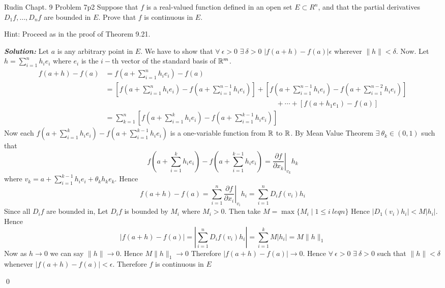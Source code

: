 \documentclass[a4paper, 11pt]{article}
\newcommand{\Qed}{\begin{flushright}\qed\end{flushright}}
\newcommand{\sol}[1]{\begin{solution}#1\end{solution}\Qed}
\newcommand{\parinn}{\setlength{\parindent}{1cm}}
\newenvironment{solution}
{\textbf{\textit{Solution: }}\setlength{\parindent}{1cm}}
{}
\begin{document}
	
	
	\begin{problem}{Rudin Chapt. 9 Problem 7}{p2%
		}
		Suppose that $f$ is a real-valued function defined in an open set $E \subset R^{n}$, and that the partial derivatives $D_{1} f, \ldots, D_{n} f$ are bounded in $E$. Prove that $f$ is continuous in $E$.\parinn
		
		Hint: Proceed as in the proof of Theorem 9.21.
	\end{problem}
	
	\sol{Let $a$ is any arbitrary point in $E$. We have to show that $\forall\ \epsilon>0$ $\exists \ \delta>0$ $|f(a+h)-f(a)|\epsilon$ wherever $\|h\|<\delta$. Now. Let $h=\sum\limits_{i=1}^n h_ie_i$ where $e_i$ is the $i-$th vector of the standard basis of $\mathbb{R}^m$. \begin{align*}
		f(a+h)-f(a) & =f\left(a+\sum_{i=1}^nh_ie_i\right)-f(a)                                                                                                                                                                                                      \\
		            & =\left[f\left(a+\sum_{i=1}^nh_ie_i\right)-f\left(a+\sum_{i=1}^{n-1}h_ie_i\right)\right]+\left[f\left(a+\sum_{i=1}^{n-1}h_ie_i\right)-f\left(a+\sum_{i=1}^{n-2}h_ie_i\right)\right]\\
		            & \qquad\qquad\qquad\qquad\qquad\qquad\qquad\qquad\qquad\qquad\qquad\qquad+\cdots+\left[f\left(a+h_1e_1\right)-f\left(a\right)\right] \\
		            & =\sum_{k=1}^n\left[f\left(a+\sum_{i=1}^kh_ie_i\right)-f\left(a+\sum_{i=1}^{k-1}h_ie_i\right)\right]
	\end{align*} Now each $f\left(a+\sum\limits_{i=1}^kh_ie_i\right)-f\left(a+\sum\limits_{i=1}^{k-1}h_ie_i\right)$ is a one-variable function from $\mathbb{R}$ to $\mathbb{R}$. By Mean Value Theorem $\exists \ \theta_k\in \left(0,1\right)$ such that $$f\left(a+\sum\limits_{i=1}^kh_ie_i\right)-f\left(a+\sum\limits_{i=1}^{k-1}h_ie_i\right)=\left.\frac{\partial f}{\partial x_k}\right|_{v_k}h_k$$where $v_k= a+\sum\limits_{i=1}^{k-1} h_ie_i+\theta_k h_k e_k$. Hence $$f(a+h)-f(a)=\sum_{i=1}^n \left.\frac{\partial f}{\partial x_i}\right|_{v_i}h_i=\sum_{i=1}^nD_if(v_i)h_i$$Since all $D_if$ are bounded in, Let $D_if$ is bounded by $M_i$ where $M_i>0$. Then take $M=\max\{M_i\mid 1\leq i\ leq n\}$ Hence $\left|D_1(v_i)h_i\right|<M|h_i|$. Hence
	$$|f(a+h)-f(a)|=\left|\sum_{i=1}^nD_if(v_i)h_i\right|=\sum_{i=1}^kM|h_i|=M\|h\|_1$$Now as $h\to 0$ we can say $\|h\|\to 0$. Hence $M\|h\|_1\to 0$ Therefore $|f(a+h)-f(a)|\to 0$. Hence $\forall\ \epsilon>0$ $\exists\ \delta>0$ such that $\|h\|<\delta$ whenever $|f(a+h)-f(a)|<\epsilon$. Therefore $f$ is continuous in $E$}
	
\end{document}
